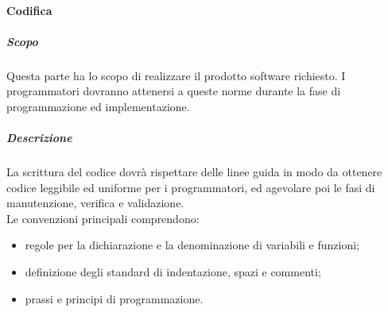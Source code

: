 			\paragraph{Codifica}
			\subparagraph{Scopo}
			Questa parte ha lo scopo di realizzare il prodotto software richiesto. I programmatori dovranno attenersi a queste norme durante la fase di programmazione ed implementazione.
			\subparagraph{Descrizione}
			La scrittura del codice dovrà rispettare delle linee guida in modo da ottenere codice leggibile ed uniforme per i programmatori, ed agevolare poi le fasi di manutenzione, verifica e validazione. \\
			Le convenzioni principali comprendono:
			\begin{itemize}
				\item regole per la dichiarazione e la denominazione di variabili e funzioni;
				\item definizione degli standard di indentazione, spazi e commenti;
				\item prassi e principi di programmazione.
			\end{itemize}
